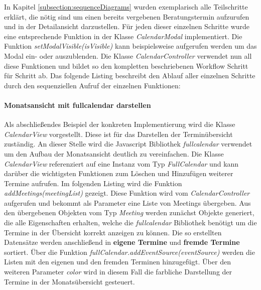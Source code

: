 In Kapitel \ref{subsection:sequenceDiagrams} wurden exemplarisch alle
Teilschritte erklärt, die nötig sind um einen bereits vergebenen
Beratungstermin aufzurufen und in der Detailansicht darzustellen. Für jeden
dieser einzelnen Schritte wurde eine entsprechende Funktion in der Klasse
\textit{CalendarModal} implementiert. Die Funktion
\textit{setModalVisible(isVisible)} kann beispielsweise aufgerufen werden um
das Modal ein- oder auszublenden. Die Klasse \textit{CalendarController}
verwendet nun all diese Funktionen und bildet so den kompletten beschriebenen
Workflow Schritt für Schritt ab. Das folgende Listing beschreibt den Ablauf
aller einzelnen Schritte durch den sequenziellen Aufruf der einzelnen
Funktionen:



\paragraph{Monatsansicht mit fullcalendar darstellen}

Als abschließendes Beispiel der konkreten Implementierung wird die Klasse
\textit{CalendarView} vorgestellt. Diese ist für das Darstellen der
Terminübersicht zuständig. An dieser Stelle wird die Javascript Bibliothek
\textit{fullcalendar}\cite{fullCalendarWeb} verwendet um den Aufbau der
Monatsansicht deutlich zu vereinfachen. Die Klasse \textit{CalendarView}
referenziert auf eine Instanz vom Typ \textit{FullCalendar} und kann darüber
die wichtigsten Funktionen zum Löschen und Hinzufügen weiterer Termine
aufrufen. Im folgenden Listing wird die Funktion
\textit{addMeetings(meetingList)} gezeigt. Diese Funktion wird vom
\textit{CalendarController} aufgerufen und bekommt als Parameter eine Liste von
Meetings übergeben. Aus den übergebenen Objekten vom Typ \textit{Meeting}
werden zunächst Objekte generiert, die alle Eigenschaften erhalten, welche die
\textit{fullcalendar} Bibliothek benötigt um die Termine in der Übersicht
korrekt anzeigen zu können. Die so erstellten Datensätze werden anschließend in
\textbf{eigene Termine} und \textbf{fremde Termine} sortiert. Über die Funktion
\textit{fullCalendar.addEventSource(eventSource)} werden die Listen mit den
eigenen und den fremden Terminen hinzugefügt. Über den weiteren Parameter
\textit{color} wird in diesem Fall die farbliche Darstellung der Termine in der
Monatsübersicht gesteuert.



